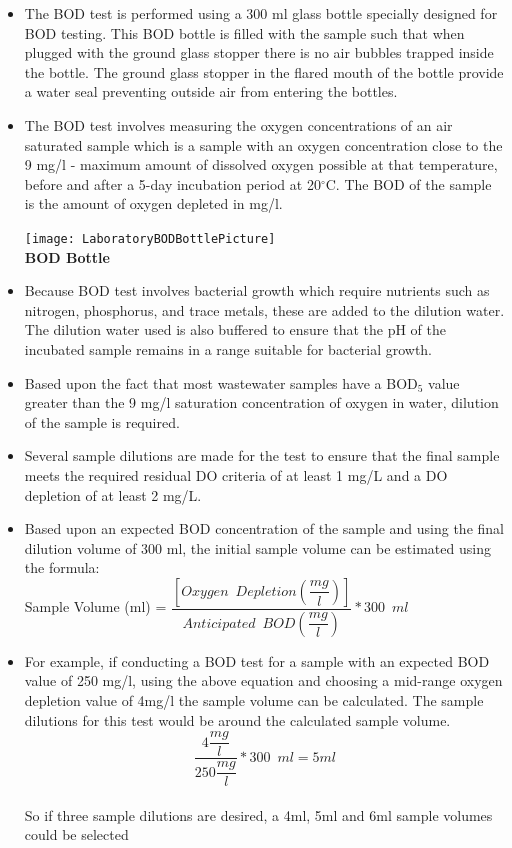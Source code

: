 \begin{itemize}
			      		
			      		\item The BOD test is performed using a 300 ml glass bottle specially designed for BOD testing.  This BOD bottle is filled with the sample such that when plugged with the ground glass stopper there is no air bubbles trapped inside the bottle.  The ground glass stopper in the flared mouth of the bottle provide a water seal preventing outside air from entering the bottles.     
			      		\item The BOD test involves measuring the oxygen concentrations of an air saturated sample which is a sample with an oxygen concentration close to the 9 mg/l - maximum amount of dissolved oxygen possible at that temperature, before and after a 5-day incubation period at 20$^\circ$C.  The BOD of the sample is the amount of oxygen depleted in mg/l.				
\begin{center}
\texttt{[image: LaboratoryBODBottlePicture]}\\

\textbf{BOD Bottle}\\
\end{center}
			      		\item Because BOD test involves bacterial growth which require nutrients such as nitrogen, phosphorus, and trace metals, these are added to the dilution water.  The dilution water used is also buffered to ensure that the pH of the incubated sample remains in a range suitable for bacterial growth.
			      		\item Based upon the fact that most wastewater samples have a BOD$_5$ value greater than the 9 mg/l saturation concentration of oxygen in water, dilution of the sample is required.
\item Several sample dilutions are made for the test to ensure that the final sample meets the required residual DO criteria of at least 1 mg/L and a DO depletion of at least 2 mg/L.

\item Based upon an expected BOD concentration of the sample and using the final dilution volume of 300 ml, the initial sample volume can be estimated using the formula:\\

Sample Volume (ml) = $\dfrac{[Oxygen \enspace Depletion (\dfrac{mg}{l})]}{Anticipated \enspace BOD (\dfrac{mg}{l})}*300 \enspace ml$\\
					
\item For example, if conducting a BOD test for a sample with an expected BOD value of 250 mg/l, using the above equation and choosing a mid-range oxygen depletion value of 4mg/l the sample volume can be calculated.  The sample dilutions for this test would be around the calculated sample volume.\\
$$\dfrac{4\dfrac{mg}{l}}{250 \dfrac{mg}{l}}*300 \enspace ml=5ml$$\\
So if three sample dilutions are desired, a 4ml, 5ml and 6ml sample volumes could be selected
			      		
			      	\end{itemize}


